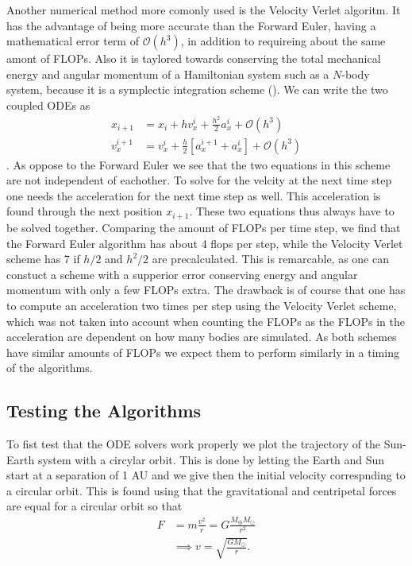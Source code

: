 \documentclass[twocolumn]{aastex62}
\begin{document}
Another numerical method more comonly used is the Velocity Verlet algoritm. It
has the advantage of being more accurate than the Forward Euler, having a
mathematical error term of $\mathcal{O}(h^3)$, in addition to requireing about
the same amont of FLOPs. Also it is taylored towards conserving the total
mechanical energy and angular momentum of a Hamiltonian system such as a
$N$-body system, because it is a symplectic integration scheme (\cite{holmes:2007}). We can write the
two coupled ODEs as 
\begin{align}
    x_{i+1} &= x_i + hv_x^i + \frac{h^2}{2}a_x^i + \mathcal{O}(h^3)\\
    v_x^{i+1} &= v_x^i + \frac{h}{2}[a_x^{i+1} + a_x^i] + \mathcal{O}(h^3)
\end{align}
\cite{jensen:2015}.
As oppose to the Forward Euler we see that the two equations in this scheme are
not independent of eachother. To solve for the velcity at the next time step one
needs the acceleration for the next time step as well. This acceleration is
found through the next position $x_{i+1}$. These two equations thus always have
to be solved together. Comparing the amount of FLOPs per time step, we find that
the Forward Euler algorithm has about 4 flops per step, while the Velocity
Verlet scheme has 7 if $h/2$ and $h^2/2$ are precalculated. This is remarcable,
as one can constuct a scheme with a supperior error conserving energy and
angular momentum with only a few FLOPs extra. The drawback is of course that one
has to compute an acceleration two times per step using the Velocity Verlet
scheme, which was not taken into account when counting the FLOPs as the FLOPs in
the acceleration are dependent on how many bodies are simulated.
As both schemes have similar amounts of FLOPs we expect them to perform
similarly in a timing of the algorithms.


\subsection{Testing the Algorithms} \label{subsec:algo_test}
To fist test that the ODE solvers work properly we plot the trajectory of the
Sun-Earth system with a circylar orbit. This is done by letting the Earth and
Sun start at a separation of 1 AU and we give then the initial velocity
correspnding to a circular orbit. This is found using that the gravitational and
centripetal forces are equal for a circular orbit so that 
\begin{align}
    F &= m\frac{v^2}{r} = G\frac{M_\oplus M_\odot}{r^2} \\
    &\implies v = \sqrt{\frac{GM_\odot}{r}}.
\end{align}
\end{document}
